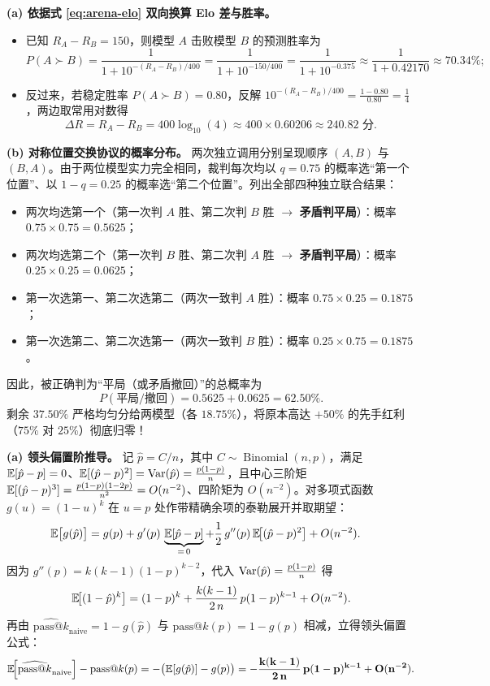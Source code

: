 \textbf{(a) 依据式 \eqref{eq:arena-elo} 双向换算 Elo 差与胜率。}
\begin{itemize}
  \item 已知 $R_A - R_B = 150$，则模型 $A$ 击败模型 $B$ 的预测胜率为
  \[
    P(A \succ B) = \frac{1}{1 + 10^{-(R_A - R_B)/400}}
    = \frac{1}{1 + 10^{-150/400}}
    = \frac{1}{1 + 10^{-0.375}}
    \approx \frac{1}{1 + 0.42170}
    \approx \mathbf{70.34\%};
  \]
  \item 反过来，若稳定胜率 $P(A \succ B) = 0.80$，反解 $10^{-(R_A - R_B)/400} = \frac{1 - 0.80}{0.80} = \frac{1}{4}$，两边取常用对数得
  \[
    \Delta R = R_A - R_B = 400 \log_{10}(4) \approx 400 \times 0.60206 \approx \mathbf{240.82 \text{ 分}}.
  \]
\end{itemize}

\textbf{(b) 对称位置交换协议的概率分布。}
两次独立调用分别呈现顺序 $(A, B)$ 与 $(B, A)$。由于两位模型实力完全相同，裁判每次均以 $q = 0.75$ 的概率选“第一个位置”、以 $1 - q = 0.25$ 的概率选“第二个位置”。列出全部四种独立联合结果：
\begin{itemize}
  \item 两次均选第一个（第一次判 $A$ 胜、第二次判 $B$ 胜 $\to$ \textbf{矛盾判平局}）：概率 $0.75 \times 0.75 = 0.5625$；
  \item 两次均选第二个（第一次判 $B$ 胜、第二次判 $A$ 胜 $\to$ \textbf{矛盾判平局}）：概率 $0.25 \times 0.25 = 0.0625$；
  \item 第一次选第一、第二次选第二（两次一致判 $A$ 胜）：概率 $0.75 \times 0.25 = \mathbf{0.1875}$；
  \item 第一次选第二、第二次选第一（两次一致判 $B$ 胜）：概率 $0.25 \times 0.75 = \mathbf{0.1875}$。
\end{itemize}
因此，被正确判为“平局（或矛盾撤回）”的总概率为
\[
  P(\text{平局/撤回}) = 0.5625 + 0.0625 = \mathbf{62.50\%}.
\]
剩余 $37.50\%$ 严格均匀分给两模型（各 $18.75\%$），将原本高达 $+50\%$ 的先手红利（$75\%$ 对 $25\%$）彻底归零！


\textbf{(a) 领头偏置阶推导。}
记 $\hat{p} = C/n$，其中 $C \sim \operatorname{Binomial}(n, p)$，满足 $\mathbb{E}[\hat{p} - p] = 0$、$\mathbb{E}[(\hat{p} - p)^2] = \operatorname{Var}(\hat{p}) = \frac{p(1-p)}{n}$，且中心三阶矩 $\mathbb{E}[(\hat{p} - p)^3] = \frac{p(1-p)(1-2p)}{n^2} = O(n^{-2})$、四阶矩为 $O(n^{-2})$。对多项式函数 $g(u) = (1 - u)^k$ 在 $u = p$ 处作带精确余项的泰勒展开并取期望：
\begin{align*}
  \mathbb{E}\big[g(\hat{p})\big]
  &= g(p) + g'(p)\,\underbrace{\mathbb{E}[\hat{p} - p]}_{=\,0}
     + \frac{1}{2}\,g''(p)\,\mathbb{E}\!\big[(\hat{p} - p)^2\big] + O(n^{-2}).
\end{align*}
因为 $g''(p) = k(k - 1)(1 - p)^{k - 2}$，代入 $\operatorname{Var}(\hat{p}) = \frac{p(1-p)}{n}$ 得
\[
  \mathbb{E}\!\big[(1 - \hat{p})^k\big]
  = (1 - p)^k + \frac{k(k - 1)}{2\,n}\,p(1 - p)^{k - 1} + O(n^{-2}).
\]
再由 $\widehat{\mathrm{pass@}k}_{\text{naive}} = 1 - g(\hat{p})$ 与 $\mathrm{pass@}k(p) = 1 - g(p)$ 相减，立得领头偏置公式：
\[
  \mathbb{E}\!\Big[\widehat{\mathrm{pass@}k}_{\text{naive}}\Big] - \mathrm{pass@}k(p)
  = -\big(\mathbb{E}[g(\hat{p})] - g(p)\big)
  = \mathbf{-\frac{k(k - 1)}{2\,n}\,p(1 - p)^{k - 1} + O(n^{-2})}.
\]

